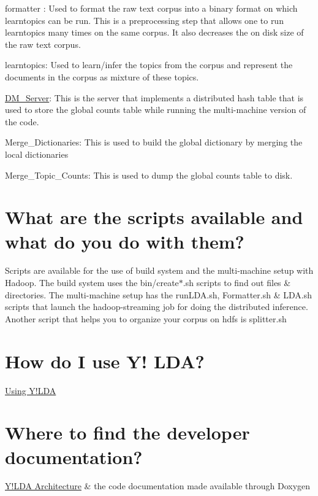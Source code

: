 \begin{DoxyEnumerate}
\item 

formatter : Used to format the raw text corpus into a binary format on which learntopics can be run. This is a preprocessing step that allows one to run learntopics many times on the same corpus. It also decreases the on disk size of the raw text corpus. 
\item 

learntopics: Used to learn/infer the topics from the corpus and represent the documents in the corpus as mixture of these topics. 
\item 

\hyperlink{class_d_m___server}{DM\_\-Server}: This is the server that implements a distributed hash table that is used to store the global counts table while running the multi-\/machine version of the code. 
\item 

Merge\_\-Dictionaries: This is used to build the global dictionary by merging the local dictionaries 
\item 

Merge\_\-Topic\_\-Counts: This is used to dump the global counts table to disk. 
\end{DoxyEnumerate}

\par
  \section*{What are the scripts available and what do you do with them?}

Scripts are available for the use of build system and the multi-\/machine setup with Hadoop. The build system uses the bin/create$\ast$.sh scripts to find out files \& directories. The multi-\/machine setup has the runLDA.sh, Formatter.sh \& LDA.sh scripts that launch the hadoop-\/streaming job for doing the distributed inference. Another script that helps you to organize your corpus on hdfs is splitter.sh 

\section*{How do I use Y! LDA?}

\hyperlink{usage}{Using Y!LDA} 

\section*{Where to find the developer documentation?}

\hyperlink{architecture}{Y!LDA Architecture} \& the code documentation made available through Doxygen 